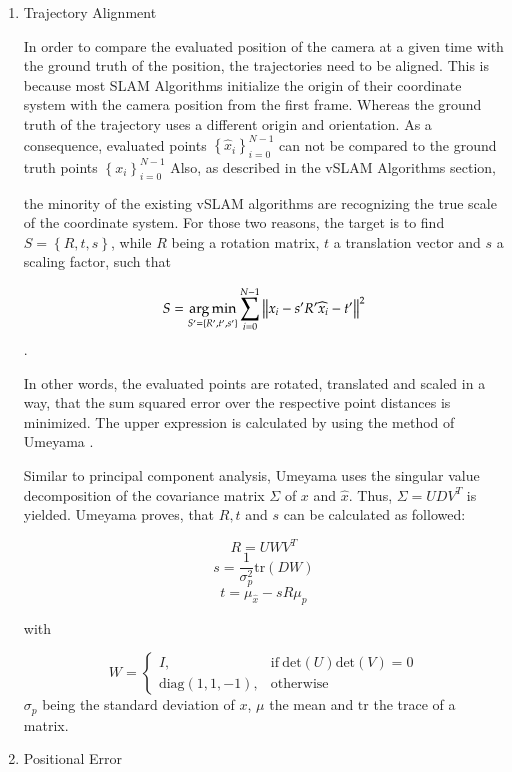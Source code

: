 	\begin{enumerate}
	\item{Trajectory Alignment}
	
	In order to compare the evaluated position of the camera at a given time with the ground truth of the 
	position, the trajectories need to be aligned. This is because most SLAM Algorithms initialize the origin
	of their coordinate system with the camera position from the first frame. Whereas the ground truth of the 
	trajectory uses a different origin and orientation. As a consequence, evaluated points $ \left\{{\widehat{x}_i}\right\}_{i=0}^{N-1}$ can not be 
	compared to the ground truth points $\left\{{x_i}\right\}_{i=0}^{N-1}$
	Also, as described in the vSLAM Algorithms section,
	
	
	the minority of the existing vSLAM algorithms are recognizing the true scale of the coordinate system. For
	those two reasons, the target is to find $S = \left\{R,t,s\right\}$, while $R$ being a rotation matrix, $t$ a translation vector
	and $s$ a scaling factor, 
	such that
	
	$$ S = \mathop{\mathrm{arg\,min}}_{S' = \left\{R', t', s' \right\}} \sum_{i = 0}^{N-1} \left\lVert x_i - s'R'\widehat{x}_i - t'\right\rVert^2 $$ .
	
	In other words, the evaluated points are rotated, translated and scaled in a way, that the sum squared error over the respective point
	distances is minimized. The upper expression is calculated by using the method of Umeyama \cite{ume}. 
	
	Similar to principal component analysis, Umeyama uses the singular value decomposition of the covariance 
	matrix $\Sigma$ of $x$ and $\widehat{x}$. Thus, 
	$\Sigma = UDV^T$ is yielded. Umeyama proves, that $R,t$ and $s$ can be calculated as followed: 
	
	$$ R = UWV^T $$
	$$ s = \frac{1}{\sigma^2_p}\text{tr}\left(DW\right)$$
	$$ t = \mu_{\widehat{x}} - sR\mu_p $$
	
	with 
	
	$$ W = \begin{cases}
      I, & \text{if}\ \text{det}\left(U\right)\text{det}\left(V\right) =0 \\
      \text{diag}\left(1,1,-1\right), & \text{otherwise}
    \end{cases}$$
	$\sigma_p$ being the standard deviation of $x$, $\mu$ the mean and $\text{tr}$ the trace of a matrix. 
	
	\item{Positional Error}
	

\end{enumerate}
